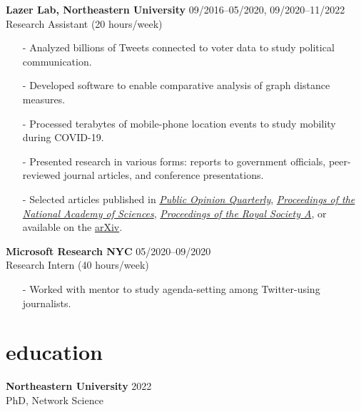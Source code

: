 \documentclass[11pt, letter]{article}
\begin{document}
\vspace{2.75mm}
\textbf{Lazer Lab, Northeastern University} \hfill 09/2016--05/2020, 09/2020--11/2022 \\
Research Assistant (20 hours/week)\\
\begin{itemize}[noitemsep,topsep=0pt]
\item[-] Analyzed billions of Tweets connected to voter data to study political communication.
\item[-] Developed software to enable comparative analysis of graph distance measures. \\
\item[-] Processed terabytes of mobile-phone location events to study mobility during COVID-19. \\
\item[-] Presented research in various forms: reports to government officials, peer-reviewed journal articles, and conference presentations.
\item[-] Selected articles published in \href{https://academic.oup.com/poq/article/85/S1/323/6342443?guestAccessKey=3c4778c7-e064-4647-b223-6caa3ab9e002}{\emph{Public Opinion Quarterly}}, \href{https://www.pnas.org/doi/10.1073/pnas.2115900119}{\emph{Proceedings of the National Academy of Sciences}}, \href{https://royalsocietypublishing.org/doi/10.1098/rspa.2019.0744}{\emph{Proceedings of the Royal Society A}}, or available on the \href{https://arxiv.org/abs/2212.08873}{arXiv}.
\end{itemize}

\vspace{2.75mm}
\textbf{Microsoft Research NYC}  \hfill 05/2020--09/2020 \\
Research Intern (40 hours/week)\\
\begin{itemize}[noitemsep,topsep=0pt]
\item[-] Worked with mentor to study agenda-setting among Twitter-using journalists.
\end{itemize}

\vspace{-1mm}

\section{education}
\textbf{Northeastern University}  \hfill 2022 \\
PhD, Network Science %
\vspace{2.75mm}
\end{document}
